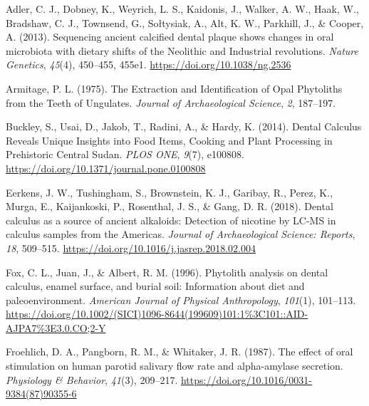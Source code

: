 \documentclass[
  letterpaper,
]{book}
\newlength{\cslhangindent}
\newlength{\cslentryspacingunit} %
\newenvironment{CSLReferences}[2] %
 {%
  \setlength{\parindent}{0pt}
  \ifodd #1
  \let\oldpar\par
  \def\par{\hangindent=\cslhangindent\oldpar}
  \fi
  \setlength{\parskip}{#2\cslentryspacingunit}
 }%
 {}
\begin{document}
\hypertarget{refs-6}{}
\begin{CSLReferences}{1}{0}
\leavevmode{}%
Adler, C. J., Dobney, K., Weyrich, L. S., Kaidonis, J., Walker, A. W.,
Haak, W., Bradshaw, C. J., Townsend, G., Sołtysiak, A., Alt, K. W.,
Parkhill, J., \& Cooper, A. (2013). Sequencing ancient calcified dental
plaque shows changes in oral microbiota with dietary shifts of the
{Neolithic} and {Industrial} revolutions. \emph{Nature Genetics},
\emph{45}(4), 450--455, 455e1. \url{https://doi.org/10.1038/ng.2536}

\leavevmode{}%
Armitage, P. L. (1975). The {Extraction} and {Identification} of {Opal
Phytoliths} from the {Teeth} of {Ungulates}. \emph{Journal of
Archaeological Science}, \emph{2}, 187--197.

\leavevmode{}%
Buckley, S., Usai, D., Jakob, T., Radini, A., \& Hardy, K. (2014).
Dental {Calculus Reveals Unique Insights} into {Food Items}, {Cooking}
and {Plant Processing} in {Prehistoric Central Sudan}. \emph{PLOS ONE},
\emph{9}(7), e100808. \url{https://doi.org/10.1371/journal.pone.0100808}

\leavevmode{}%
Eerkens, J. W., Tushingham, S., Brownstein, K. J., Garibay, R., Perez,
K., Murga, E., Kaijankoski, P., Rosenthal, J. S., \& Gang, D. R. (2018).
Dental calculus as a source of ancient alkaloids: {Detection} of
nicotine by {LC-MS} in calculus samples from the {Americas}.
\emph{Journal of Archaeological Science: Reports}, \emph{18}, 509--515.
\url{https://doi.org/10.1016/j.jasrep.2018.02.004}

\leavevmode{}%
Fox, C. L., Juan, J., \& Albert, R. M. (1996). Phytolith analysis on
dental calculus, enamel surface, and burial soil: {Information} about
diet and paleoenvironment. \emph{American Journal of Physical
Anthropology}, \emph{101}(1), 101--113.
\url{https://doi.org/10.1002/(SICI)1096-8644(199609)101:1\%3C101::AID-AJPA7\%3E3.0.CO;2-Y}

\leavevmode{}%
Froehlich, D. A., Pangborn, R. M., \& Whitaker, J. R. (1987). The effect
of oral stimulation on human parotid salivary flow rate and
alpha-amylase secretion. \emph{Physiology \& Behavior}, \emph{41}(3),
209--217. \url{https://doi.org/10.1016/0031-9384(87)90355-6}


\end{CSLReferences}
\end{document}
